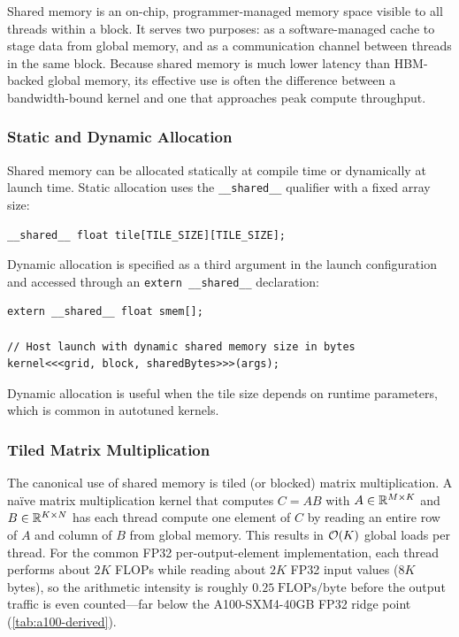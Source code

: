 Shared memory is an on-chip, programmer-managed memory space visible to all threads within a block. It serves two purposes: as a software-managed cache to stage data from global memory, and as a communication channel between threads in the same block. Because shared memory is much lower latency than HBM-backed global memory, its effective use is often the difference between a bandwidth-bound kernel and one that approaches peak compute throughput.

\subsubsection{Static and Dynamic Allocation}

Shared memory can be allocated statically at compile time or dynamically at launch time. Static allocation uses the \lstinline[language=CUDA]{__shared__} qualifier with a fixed array size:

\begin{lstlisting}[language=CUDA, caption={Static shared memory allocation for a tile.}, label={lst:shmem-static}]
__shared__ float tile[TILE_SIZE][TILE_SIZE];
\end{lstlisting}

Dynamic allocation is specified as a third argument in the launch configuration and accessed through an \lstinline[language=CUDA]{extern __shared__} declaration:

\begin{lstlisting}[language=CUDA, caption={Dynamic shared memory allocation.}, label={lst:shmem-dynamic}]
extern __shared__ float smem[];

// Host launch with dynamic shared memory size in bytes
kernel<<<grid, block, sharedBytes>>>(args);
\end{lstlisting}

Dynamic allocation is useful when the tile size depends on runtime parameters, which is common in autotuned kernels.

\subsubsection{Tiled Matrix Multiplication}\label{sec:tiled-matmul}

The canonical use of shared memory is tiled (or blocked) matrix multiplication. A na\"ive matrix multiplication kernel that computes $C = AB$ with $A \in \mathbb{R}^{M \times K}$ and $B \in \mathbb{R}^{K \times N}$ has each thread compute one element of $C$ by reading an entire row of $A$ and column of $B$ from global memory. This results in $\mathcal{O}(K)$ global loads per thread. For the common FP32 per-output-element implementation, each thread performs about $2K$ FLOPs while reading about $2K$ FP32 input values ($8K$ bytes), so the arithmetic intensity is roughly $0.25\;\text{FLOPs}/\text{byte}$ before the output traffic is even counted---far below the A100-SXM4-40GB FP32 ridge point (\cref{tab:a100-derived}).

